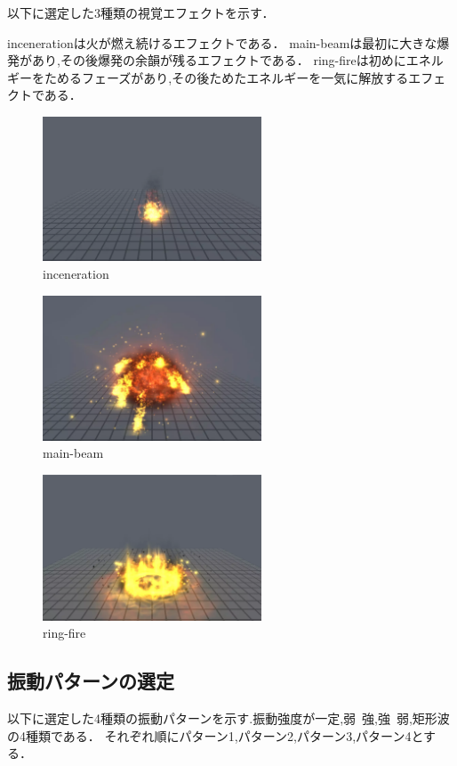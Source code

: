 以下に選定した3種類の視覚エフェクトを示す．

incenerationは火が燃え続けるエフェクトである．
main-beamは最初に大きな爆発があり,その後爆発の余韻が残るエフェクトである．
ring-fireは初めにエネルギーをためるフェーズがあり,その後ためたエネルギーを一気に解放するエフェクトである．

\begin{figure}[h]
\centering
\includegraphics[clip,width=6.5cm]{./fig/firefire.png}
\caption{inceneration}\label{fire}
\end{figure}

\begin{figure}[h]
\centering
\includegraphics[clip,width=6.5cm]{./fig/explosion.png}
\caption{main-beam}\label{explosion}
\end{figure}

\begin{figure}[h]
\centering
\includegraphics[clip,width=6.5cm]{./fig/ringfire.png}
\caption{ring-fire}\label{ringfire}
\end{figure}


\newpage
\subsection{振動パターンの選定}
以下に選定した4種類の振動パターンを示す.振動強度が一定,弱~強,強~弱,矩形波の4種類である．
それぞれ順にパターン1,パターン2,パターン3,パターン4とする．

